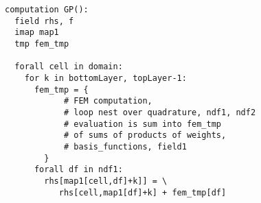 \documentclass[a4]{article}
\begin{document}
\begin{lstlisting}[style=dsl]
computation GP():
  field rhs, f
  imap map1
  tmp fem_tmp

  forall cell in domain:
    for k in bottomLayer, topLayer-1:
      fem_tmp = {
            # FEM computation, 
            # loop nest over quadrature, ndf1, ndf2
            # evaluation is sum into fem_tmp
            # of sums of products of weights, 
            # basis_functions, field1
        }
      forall df in ndf1:
        rhs[map1[cell,df]+k]] = \ 
           rhs[cell,map1[df]+k] + fem_tmp[df]

\end{lstlisting}
\end{document}
